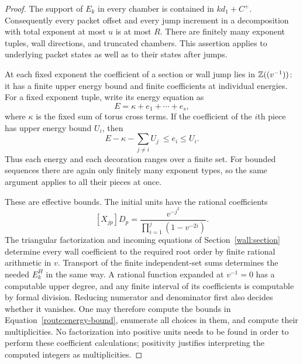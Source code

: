 \begin{proof}
The support of $E_k$ in every chamber is contained in $kd_1+C^+$.
Consequently every packet offset and every jump increment in a
decomposition with total exponent at most $u$ is at most $R$.
There are finitely many exponent tuples, wall directions, and truncated
chambers.  This assertion applies to underlying packet states as well
as to their states after jumps.

At each fixed exponent the coefficient of a section or wall jump lies
in $\mathbb Z((v^{-1}))$: it has a finite upper energy bound and finite
coefficients at individual energies.  For a fixed exponent tuple,
write its energy equation as
\[
 E=\kappa+e_1+\cdots+e_s,
\]
where $\kappa$ is the fixed sum of torus cross terms.  If the coefficient
of the $i$th piece has upper energy bound $U_i$, then
\begin{equation}
 \label{route:energy-bound}
 E-\kappa-\sum_{j\ne i}U_j\ \leq e_i\leq U_i.
\end{equation}
Thus each energy and each decoration ranges over a finite set.  For
bounded sequences there are again only finitely many exponent types,
so the same argument applies to all their pieces at once.

These are effective bounds.  The initial units have the rational
coefficients
\[
 [X_{jp}]D_p=
 \frac{v^{-j^2}}{\prod_{i=1}^j(1-v^{-2i})}.
\]
The triangular factorization and incoming equations of
Section~\ref{wall:section} determine every wall coefficient to the
required root order by finite rational arithmetic in $v$.  Transport
of the finite independent-set sums determines the needed $E_k^H$ in
the same way.  A rational function expanded at $v^{-1}=0$ has a
computable upper degree, and any finite interval of its coefficients
is computable by formal division.  Reducing numerator and denominator
first also decides whether it vanishes.  One may therefore compute
the bounds in Equation~\eqref{route:energy-bound}, enumerate all choices in
them, and compute their multiplicities.  No factorization into
positive units needs to be found in order to perform these
coefficient calculations; positivity justifies interpreting the
computed integers as multiplicities.
\end{proof}

